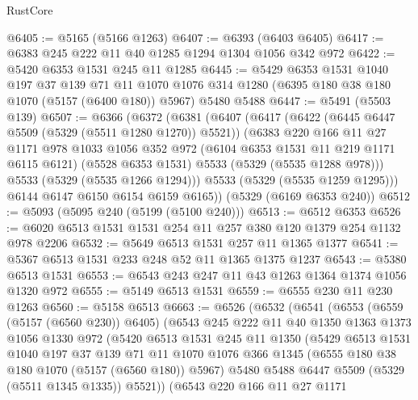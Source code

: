 \begin{lexlean}{RustCore}
\begin{coremodule}
@6405 := @5165 (@5166 @1263)
@6407 := @6393 (@6403 @6405)
@6417 := @6383 @245 @222 @11 @40 @1285 @1294 @1304 @1056 @342 @972
@6422 := @5420 @6353 @1531 @245 @11 @1285
@6445 := @5429
    @6353
    @1531
    @1040
    @197
    @37
    @139
    @71
    @11
    @1070
    @1076
    @314
    @1280
    (@6395 @180 @38 @180 @1070 (@5157 (@6400 @180)) @5967)
    @5480
    @5488
@6447 := @5491 (@5503 @139)
@6507 := @6366
    (@6372
      (@6381
        (@6407
          (@6417
            (@6422 (@6445 @6447 @5509 (@5329 (@5511 @1280 @1270)) @5521))
            (@6383
              @220
              @166
              @11
              @27
              @1171
              @978
              @1033
              @1056
              @352
              @972
              (@6104 @6353 @1531 @11 @219 @1171 @6115 @6121)
              (@5528 @6353 @1531)
              @5533
              (@5329 (@5535 @1288 @978)))
            @5533
            (@5329 (@5535 @1266 @1294)))
          @5533
          (@5329 (@5535 @1259 @1295)))
        @6144
        @6147
        @6150
        @6154
        @6159
        @6165))
    (@5329 (@6169 @6353 @240))
@6512 := @5093 (@5095 @240 (@5199 (@5100 @240)))
@6513 := @6512 @6353
@6526 := @6020 @6513 @1531 @1531 @254 @11 @257 @380 @120 @1379 @254 @1132 @978 @2206
@6532 := @5649 @6513 @1531 @257 @11 @1365 @1377
@6541 := @5367 @6513 @1531 @233 @248 @52 @11 @1365 @1375 @1237
@6543 := @5380 @6513 @1531
@6553 := @6543 @243 @247 @11 @43 @1263 @1364 @1374 @1056 @1320 @972
@6555 := @5149 @6513 @1531
@6559 := @6555 @230 @11 @230 @1263
@6560 := @5158 @6513
@6663 := @6526
    (@6532
      (@6541
        (@6553
          (@6559 (@5157 (@6560 @230)) @6405)
          (@6543
            @245
            @222
            @11
            @40
            @1350
            @1363
            @1373
            @1056
            @1330
            @972
            (@5420
              @6513
              @1531
              @245
              @11
              @1350
              (@5429
                @6513
                @1531
                @1040
                @197
                @37
                @139
                @71
                @11
                @1070
                @1076
                @366
                @1345
                (@6555 @180 @38 @180 @1070 (@5157 (@6560 @180)) @5967)
                @5480
                @5488
                @6447
                @5509
                (@5329 (@5511 @1345 @1335))
                @5521))
            (@6543
              @220
              @166
              @11
              @27
              @1171

\end{coremodule}
\end{lexlean}

